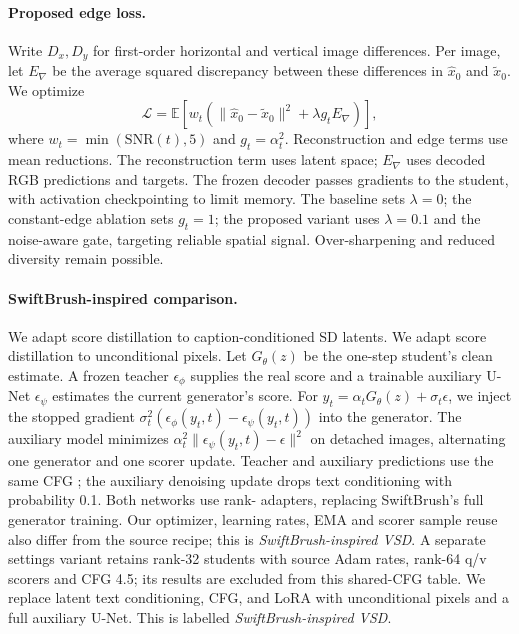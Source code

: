 \documentclass[10pt,twocolumn,letterpaper]{article}
\begin{document}
\paragraph{Proposed edge loss.}
Write $D_x,D_y$ for first-order horizontal and vertical image differences.
Per image, let $E_\nabla$ be the average squared discrepancy between these
differences in $\hat x_0$ and $\tilde x_0$. We optimize
\begin{equation}
 \mathcal L=\mathbb E\!\left[w_t\left(
 \|\hat x_0-\tilde x_0\|^2+\lambda g_t E_\nabla\right)\right],
\end{equation}
where $w_t=\min(\mathrm{SNR}(t),5)$ and $g_t=\alpha_t^2$.
Reconstruction and edge terms use mean reductions. \ifStudySD
The reconstruction term uses latent space; $E_\nabla$ uses decoded RGB
predictions and targets. The frozen decoder passes gradients to the student,
with activation checkpointing to limit memory.\fi{}
The baseline sets $\lambda=0$;
the constant-edge ablation sets $g_t=1$; the proposed variant uses
$\lambda=0.1$ and the noise-aware gate, targeting reliable spatial signal.
Over-sharpening and reduced diversity remain possible.

\paragraph{SwiftBrush-inspired comparison.}
\ifStudySD
We adapt score distillation to caption-conditioned SD latents.
\else
We adapt score distillation to unconditional \StudyDataset{} pixels.
\fi
Let $G_\theta(z)$ be the one-step student's clean estimate. A frozen teacher
$\epsilon_\phi$ supplies the real score and a trainable auxiliary U-Net
$\epsilon_\psi$ estimates the current generator's score. For
$y_t=\alpha_tG_\theta(z)+\sigma_t\epsilon$, we inject the stopped gradient
$\sigma_t^2(\epsilon_\phi(y_t,t)-\epsilon_\psi(y_t,t))$ into the generator.
The auxiliary model minimizes $\alpha_t^2\|\epsilon_\psi(y_t,t)-\epsilon\|^2$
on detached images, alternating one generator and one scorer update.
\ifStudySD
Teacher and auxiliary predictions use the same CFG \StudyGuidance{}; the
auxiliary denoising update drops text conditioning with probability 0.1.
Both networks use rank-\StudyLoRARank{} adapters, replacing SwiftBrush's full
generator training. Our optimizer, learning rates, EMA and scorer sample reuse
also differ from the source recipe; this is \emph{SwiftBrush-inspired VSD}.
A separate settings variant retains rank-32 students with source Adam rates,
rank-64 q/v scorers and CFG 4.5; its results are excluded from this shared-CFG table.
\else
We replace latent text conditioning, CFG, and LoRA with unconditional pixels
and a full auxiliary U-Net. This is labelled \emph{SwiftBrush-inspired VSD}.
\fi
\end{document}
